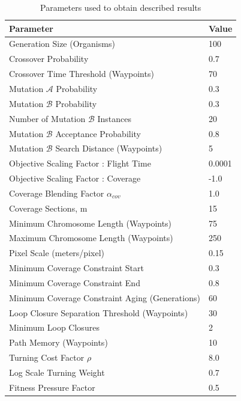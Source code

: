 \documentclass[letterpaper, 10 pt, conference]{ieeeconf}  %
\begin{document}
\begin{table}
  \caption{Parameters used to obtain described results}
\begin{tabular}{l|l}
\hline
\multicolumn{1}{|l|}{Parameter}                 & \multicolumn{1}{l|}{Value} \\ \hline
Generation Size (Organisms)                        & 100                     \\
Crossover Probability                              & 0.7                     \\
Crossover Time Threshold (Waypoints)               & 70                      \\
Mutation $\mathcal{A}$ Probability                 & 0.3                     \\
Mutation $\mathcal{B}$ Probability                 & 0.3                     \\
Number of Mutation $\mathcal{B}$ Instances         & 20                      \\
Mutation $\mathcal{B}$ Acceptance Probability      & 0.8                     \\
Mutation $\mathcal{B}$ Search Distance (Waypoints) & 5                       \\
Objective Scaling Factor : Flight Time             & 0.0001                  \\
Objective Scaling Factor : Coverage                & -1.0                    \\
Coverage Blending Factor $\alpha_{cov}$            & 1.0                     \\
Coverage Sections, m                               & 15                      \\
Minimum Chromosome Length (Waypoints)              & 75                      \\
Maximum Chromosome Length (Waypoints)              & 250                     \\
Pixel Scale (meters/pixel)                         & 0.15                    \\
Minimum Coverage Constraint Start                  & 0.3                     \\
Minimum Coverage Constraint End                    & 0.8                     \\
Minimum Coverage Constraint Aging (Generations)    & 60                      \\
Loop Closure Separation Threshold (Waypoints)      & 30                      \\
Minimum Loop Closures                              & 2                       \\
Path Memory (Waypoints)                            & 10                      \\
Turning Cost Factor $\rho$                         & 8.0                     \\
Log Scale Turning Weight                           & 0.7                     \\
Fitness Pressure Factor                            & 0.5                     \\

\end{tabular}
\label{tab:parameters}
\end{table}
\end{document}
